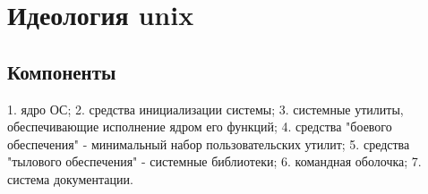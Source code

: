 \chapter {Идеология unix}
\section {Компоненты}
   1.  ядро ОС;
   2. средства инициализации системы;
   3. системные утилиты, обеспечивающие исполнение ядром его функций;
   4. средства "боевого обеспечения" - минимальный набор пользовательских утилит;
   5. средства "тылового обеспечения" - системные библиотеки;
   6. командная оболочка;
   7. система документации.
